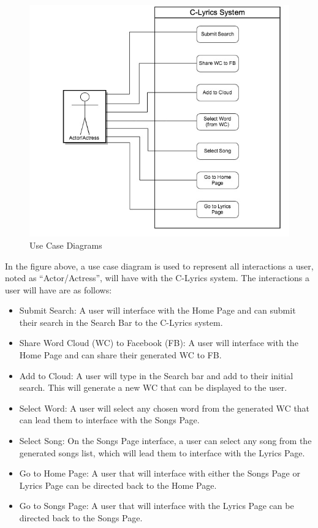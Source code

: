 \documentclass[]{article}
\begin{document}
\begin{figure}[htbp]
\centering
\includegraphics{use_case.jpg}
\caption{Use Case Diagrams}
\end{figure}

In the figure above, a use case diagram is used to represent all
interactions a user, noted as ``Actor/Actress'', will have with the
C-Lyrics system. The interactions a user will have are as follows:

\begin{itemize}
\itemsep1pt\parskip0pt
\item
  Submit Search: A user will interface with the Home Page and can submit
  their search in the Search Bar to the C-Lyrics system.
\item
  Share Word Cloud (WC) to Facebook (FB): A user will interface with the
  Home Page and can share their generated WC to FB.
\item
  Add to Cloud: A user will type in the Search bar and add to their
  initial search. This will generate a new WC that can be displayed to
  the user.
\item
  Select Word: A user will select any chosen word from the generated WC
  that can lead them to interface with the Songs Page.
\item
  Select Song: On the Songs Page interface, a user can select any song
  from the generated songs list, which will lead them to interface with
  the Lyrics Page.
\item
  Go to Home Page: A user that will interface with either the Songs Page
  or Lyrics Page can be directed back to the Home Page.
\item
  Go to Songs Page: A user that will interface with the Lyrics Page can
  be directed back to the Songs Page.
\end{itemize}
\end{document}
